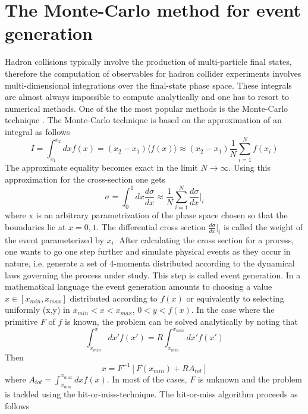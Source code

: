 \section{\label{sec:MC_method}The Monte-Carlo method for event generation}
\noindent Hadron collisions typically involve the production of multi-particle final states, therefore the computation of observables for hadron collider experiments involves multi-dimensional integrations over the final-state phase space. These integrals are almost always impossible to compute analytically and one has to resort to numerical methods. One of the the most popular methods is the Monte-Carlo technique \cite{weinzierl2000introduction}. The Monte-Carlo technique is based on the approximation of an integral as follows
\begin{equation}
    I = \int_{x_1}^{x_2}dx f(x) = (x_2-x_1)\langle f(x)\rangle \approx (x_2-x_1) \frac{1}{N}\sum_{i=1}^N f(x_i)
\end{equation}
The approximate equality becomes exact in the limit $N\rightarrow \infty$. Using this approximation for the cross-section one gets
\begin{equation}
    \sigma = \int_0^1 dx \frac{d\sigma}{dx}\approx \frac{1}{N}\sum_{i=1}^N\frac{d\sigma}{dx}\bigg|_i
\end{equation}
where x is an arbitrary parametrization of the phase space chosen so that the boundaries lie at $x = 0,1$. The differential cross section $\frac{d\sigma}{dx}\big|_i$ is called the weight of the event parameterized by $x_i$. After calculating the cross section for a process, one wants to go one step further and simulate physical events as they occur in nature, i.e. generate a set of 4-momenta distributed according to the dynamical laws governing the process under study. This step is called event generation. In a mathematical language the event generation amounts to choosing a value $x\in [x_{min}, x_{max}]$ distributed according to $f(x)$ or equivalently to selecting uniformly (x,y) in $x_{min} < x < x_{max}$, $0 < y < f(x)$. In the case where the primitive $F$ of $f$ is known, the problem can be solved analytically by noting that
\begin{equation}
    \int_{x_{min}}^x dx' f(x') = R \int_{x_{min}}^{x_{max}} dx' f(x')
\end{equation}
Then
\begin{equation}
    x = F^{-1}[F(x_{min})+RA_{tot} ]
\end{equation}
where $A_{tot} = \int_{x_{min}}^{x_{max}}dx f(x)$. In most of the cases, $F$ is unknown and the problem is tackled using the hit-or-miss-technique. The hit-or-miss algorithm proceeds as follows
